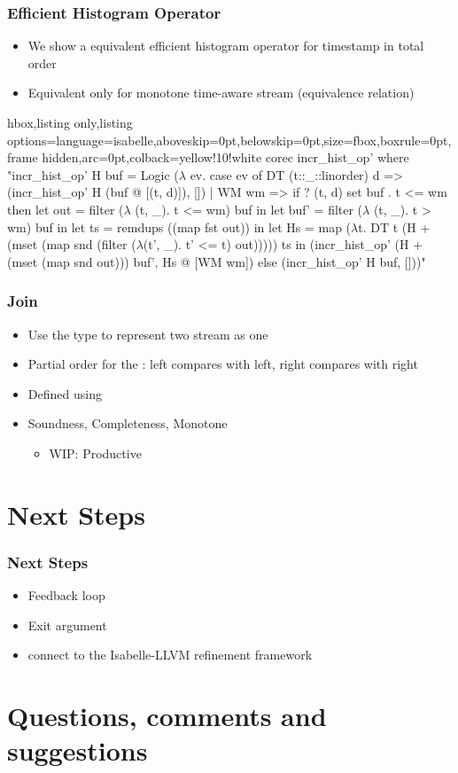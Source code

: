 \documentclass[aspectratio=169,10pt]{beamer}
\begin{document}
\begin{frame}[fragile]
  \frametitle{Efficient Histogram Operator}
  \begin{itemize}
    \item We show a equivalent efficient histogram operator for timestamp in total order
    \item Equivalent only for monotone time-aware stream (equivalence relation)
  \end{itemize}
\vspace*{-1ex}
\begin{tcblisting}{hbox,listing only,listing options={language=isabelle,aboveskip=0pt,belowskip=0pt},size=fbox,boxrule=0pt,frame hidden,arc=0pt,colback=yellow!10!white}
corec incr_hist_op' where
  "incr_hist_op' H buf = Logic ($\lambda$ ev. case ev of
    DT (t::_::linorder) d => (incr_hist_op' H (buf @ [(t, d)]), [])
  | WM wm => if ? (t, d) \in set buf . t <= wm
    then let out = filter ($\lambda$ (t, _). t <= wm) buf in
      let buf' = filter ($\lambda$ (t, _). t > wm) buf in
      let ts = remdups ((map fst out)) in
      let Hs = map
        ($\lambda$t. DT t (H + (mset (map snd (filter ($\lambda$(t', _). t' <= t) out)))))
        ts in
      (incr_hist_op' (H + (mset (map snd out))) buf', Hs @ [WM wm])
    else (incr_hist_op' H buf, []))"
\end{tcblisting}
\vspace*{-1ex}
\end{frame}

\begin{frame}[fragile]
  \frametitle{Join}
  \begin{itemize}
    \item Use the  type to represent two stream as one
    \item Partial order for the : left compares with left, right compares with right
    \item Defined using 
    \item Soundness, Completeness, Monotone
          \begin{itemize}
            \item WIP: Productive
          \end{itemize}
  \end{itemize}
\end{frame}

\section{Next Steps}

\begin{frame}
  \frametitle{Next Steps}
  \begin{itemize}
    \item Feedback loop
    \item Exit argument
    \item connect to the Isabelle-LLVM refinement framework
  \end{itemize}
\end{frame}

\section{Questions, comments and suggestions}
\end{document}
